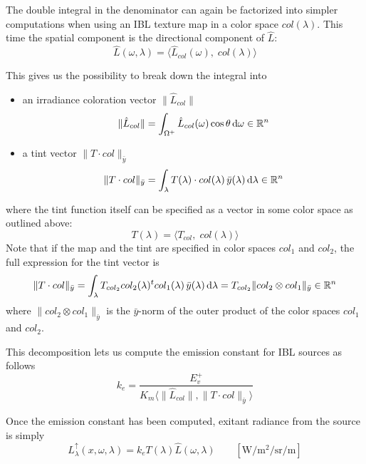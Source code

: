 The double integral in the denominator can again be factorized into simpler
computations when using an \gls{IBL} texture map in a color space $col(\lambda)$.
This time the spatial component is the directional component of $\hat{L}$:
\begin{equation}
\hat{L}(\omega, \lambda) = \big\langle \hat{L}_{col}(\omega),\; col(\lambda) \big\rangle
\end{equation}

This gives us the possibility to break down the integral into
\begin{itemize}
\item an irradiance coloration vector $\|\hat{L}_{col}\|$
\begin{equation}
\|\hat{L}_{col}\| = \int_{\Omega^+} \hat{L}_{col}(\omega)\cos\theta \mathop{}\!\mathrm{d}\omega \in \mathbb{R}^n
\end{equation}
\item a tint vector $\|T \cdot col\|_{\bar y}$
\begin{equation}
\|T \cdot col\|_{\bar y} = \int_\lambda T(\lambda)\cdot col(\lambda)\,\bar y(\lambda) \mathop{}\!\mathrm{d}\lambda \in \mathbb{R}^n
\end{equation}
\end{itemize}
where the tint function itself can be specified as a vector in some color space
as outlined above:
\begin{equation}
T(\lambda) = \langle T_{col},\; col(\lambda)\rangle
\end{equation}
Note that if the map and the tint are specified in color spaces $col_1$ and
$col_2$, the full expression for the tint vector is
\begin{equation}
\|T \cdot col\|_{\bar y} = \int_\lambda T_{col_2}col_2(\lambda)^t col_1(\lambda)\,\bar y(\lambda) \mathop{}\!\mathrm{d}\lambda
 = T_{col_2} \|col_2 \otimes col_1\|_{\bar y}
 \in \mathbb{R}^n
\end{equation}
where $\|col_2 \otimes col_1\|_{\bar y}$ is the $\bar y$-norm of the outer
product of the color spaces $col_1$ and $col_2$.

This decomposition lets us compute the emission constant for \gls{IBL} sources
as follows
\begin{equation}
k_e = \frac{E^+_v} {K_m \langle \|\hat{L}_{col}\|, \|T \cdot col\|_{\bar y}
\rangle}
\end{equation}

Once the emission constant has been computed, exitant radiance from the source
is simply
\begin{equation}
L^\uparrow_{\lambda}(x, \omega, \lambda) = k_e  T(\lambda)
\hat{L}(\omega,\lambda)
\qquad \left[\unit{\watt\per\square\meter\per\steradian\per\meter}\right]
\end{equation}

